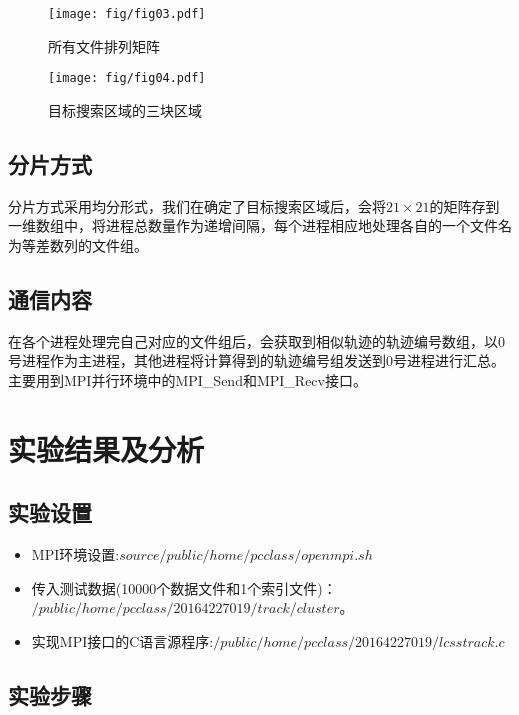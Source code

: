 \documentclass[UTF8]{ctexart}
\begin{document}
\begin{figure}[!htbp]
  \begin{minipage}[t]{0.5\linewidth}
    \centering
    \texttt{[image: fig/fig03.pdf]}
    \caption{所有文件排列矩阵 \label{sec3:subsec2:fg2}}
  \end{minipage}
  \hfill
  \begin{minipage}[t]{0.45\linewidth}
    \centering
    \texttt{[image: fig/fig04.pdf]}
    \caption{目标搜索区域的三块区域 \label{sec3:subsec2:fg3}}
  \end{minipage}
\end{figure}


\subsection{分片方式}

分片方式采用均分形式，我们在确定了目标搜索区域后，会将$21\times21$的矩阵存到一维数组中，将进程总数量作为递增间隔，每个进程相应地处理各自的一个文件名为等差数列的文件组。

\subsection{通信内容}

在各个进程处理完自己对应的文件组后，会获取到相似轨迹的轨迹编号数组，以0号进程作为主进程，其他进程将计算得到的轨迹编号组发送到0号进程进行汇总。
主要用到MPI并行环境中的MPI\_Send和MPI\_Recv接口。

\section{实验结果及分析}\label{sec4}

\subsection{实验设置}

\begin{itemize}
	\item MPI环境设置:$source /public/home/pcclass/openmpi.sh$
	\item 传入测试数据(10000个数据文件和1个索引文件)：$/public/home/pcclass/20164227019/track/cluster$。
	\item 实现MPI接口的C语言源程序:$/public/home/pcclass/20164227019/lcsstrack.c$
\end{itemize}

\subsection{实验步骤}
\label{sec4:subsec2}
\end{document}

